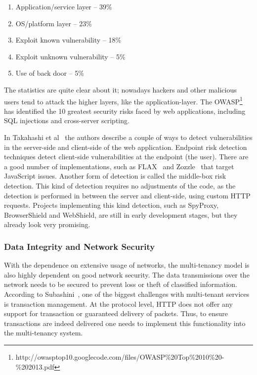 \begin{enumerate}
    \item Application/service layer – 39\%
    \item OS/platform layer – 23\%
    \item Exploit known vulnerability – 18\%
    \item Exploit unknown vulnerability – 5\%
    \item Use of back door – 5\%
\end{enumerate}

The statistics are quite clear about it; nowadays hackers and other malicious users tend to attack the higher layers, like the application-layer. 
The \ac{OWASP}\footnote{http://owasptop10.googlecode.com/files/OWASP\%20Top\%2010\%20-\%202013.pdf} has identified the 10 greatest security risks faced by web applications, including SQL injections and cross-server scripting.

In Takahashi et al~\cite{Takahashi2012Security} the authors describe a couple of ways to detect vulnerabilities in the server-side and client-side of the web application. 
Endpoint risk detection techniques detect client-side vulnerabilities at the endpoint (the user). 
There are a good number of implementations, such as FLAX~\cite{saxena10kudzu} and Zozzle~\cite{curtsinger2011zozzle} that target JavaScript issues. 
Another form of detection is called the middle-box risk detection. 
This kind of detection requires no adjustments of the code, as the detection is performed in between the server and client-side, using custom HTTP requests. 
Projects implementing this kind detection, such as SpyProxy, BrowserShield and WebShield, are still in early development stages, but they already look very promising.

\subsubsection{Data Integrity and Network Security}
With the dependence on extensive usage of networks, the multi-tenancy model is also highly dependent on good network security.  
The data transmissions over the network needs to be secured to prevent loss or theft of classified information. 
According to Subashini~\cite{Subashini2011Security}, one of the biggest challenges with multi-tenant services is transaction management. 
At the protocol level, HTTP does not offer any support for transaction or guaranteed delivery of packets. 
Thus, to ensure transactions are indeed delivered one needs to implement this functionality into the multi-tenancy system.

